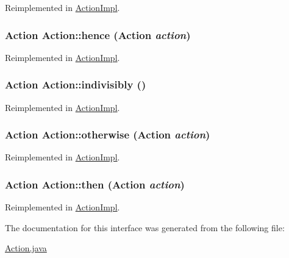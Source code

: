 Reimplemented in \hyperlink{classActionImpl_a15}{Action\-Impl}.\hypertarget{interfaceAction_a8}{
\subsubsection[hence]{\setlength{\rightskip}{0pt plus 5cm}Action Action::hence (Action {\em action})}}
\label{interfaceAction_a8}




Reimplemented in \hyperlink{classActionImpl_a18}{Action\-Impl}.\hypertarget{interfaceAction_a9}{
\subsubsection[indivisibly]{\setlength{\rightskip}{0pt plus 5cm}Action Action::indivisibly ()}}
\label{interfaceAction_a9}




Reimplemented in \hyperlink{classActionImpl_a19}{Action\-Impl}.\hypertarget{interfaceAction_a7}{
\subsubsection[otherwise]{\setlength{\rightskip}{0pt plus 5cm}Action Action::otherwise (Action {\em action})}}
\label{interfaceAction_a7}




Reimplemented in \hyperlink{classActionImpl_a17}{Action\-Impl}.\hypertarget{interfaceAction_a2}{
\subsubsection[then]{\setlength{\rightskip}{0pt plus 5cm}Action Action::then (Action {\em action})}}
\label{interfaceAction_a2}




Reimplemented in \hyperlink{classActionImpl_a12}{Action\-Impl}.

The documentation for this interface was generated from the following file:\begin{CompactItemize}
\item 
\hyperlink{Action_8java-source}{Action.java}\end{CompactItemize}
